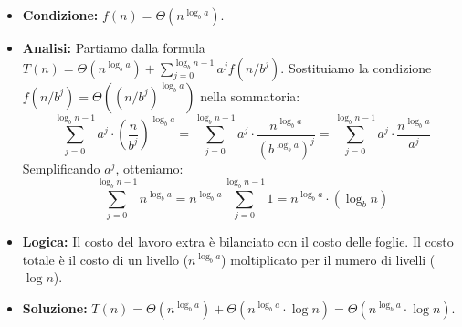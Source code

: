 \begin{definition}[Caso 2: $f(n)$ bilanciato (caso $k=0$)]
\begin{itemize}
    \item \textbf{Condizione:} $f(n) = \Theta(n^{\log_b a})$.
    \item \textbf{Analisi:} Partiamo dalla formula $T(n) = \Theta(n^{\log_b a}) + \sum_{j=0}^{\log_b n - 1} a^j f(n/b^j)$.
    Sostituiamo la condizione $f(n/b^j) = \Theta((n/b^j)^{\log_b a})$ nella sommatoria:
    \[ \sum_{j=0}^{\log_b n - 1} a^j \cdot \left(\frac{n}{b^j}\right)^{\log_b a} = \sum_{j=0}^{\log_b n - 1} a^j \cdot \frac{n^{\log_b a}}{(b^{\log_b a})^j} = \sum_{j=0}^{\log_b n - 1} a^j \cdot \frac{n^{\log_b a}}{a^j} \]
    Semplificando $a^j$, otteniamo:
    \[ \sum_{j=0}^{\log_b n - 1} n^{\log_b a} = n^{\log_b a} \sum_{j=0}^{\log_b n - 1} 1 = n^{\log_b a} \cdot (\log_b n) \]
    \item \textbf{Logica:} Il costo del lavoro extra è bilanciato con il costo delle foglie. Il costo totale è il costo di un livello ($n^{\log_b a}$) moltiplicato per il numero di livelli ($\log n$).
    \item \textbf{Soluzione:} $T(n) = \Theta(n^{\log_b a}) + \Theta(n^{\log_b a} \cdot \log n) = \Theta(n^{\log_b a} \cdot \log n)$.
\end{itemize}
\end{definition}

